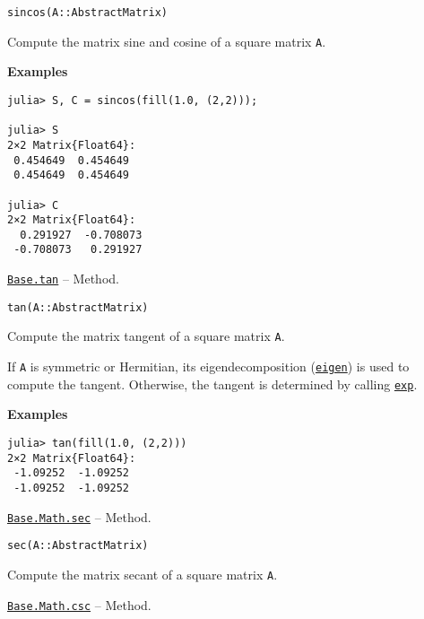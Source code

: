 \begin{adjustwidth}{2em}{0pt}


\begin{verbatim}
sincos(A::AbstractMatrix)
\end{verbatim}

Compute the matrix sine and cosine of a square matrix \texttt{A}.

\textbf{Examples}


\begin{verbatim}
julia> S, C = sincos(fill(1.0, (2,2)));

julia> S
2×2 Matrix{Float64}:
 0.454649  0.454649
 0.454649  0.454649

julia> C
2×2 Matrix{Float64}:
  0.291927  -0.708073
 -0.708073   0.291927
\end{verbatim}



\end{adjustwidth}
\hypertarget{9080944892790572256}{}
\hyperlink{9080944892790572256}{\texttt{Base.tan}}  -- {Method.}

\begin{adjustwidth}{2em}{0pt}


\begin{verbatim}
tan(A::AbstractMatrix)
\end{verbatim}

Compute the matrix tangent of a square matrix \texttt{A}.

If \texttt{A} is symmetric or Hermitian, its eigendecomposition (\hyperlink{11056016707394839114}{\texttt{eigen}}) is used to compute the tangent. Otherwise, the tangent is determined by calling \hyperlink{5801729597955756107}{\texttt{exp}}.

\textbf{Examples}


\begin{verbatim}
julia> tan(fill(1.0, (2,2)))
2×2 Matrix{Float64}:
 -1.09252  -1.09252
 -1.09252  -1.09252
\end{verbatim}



\end{adjustwidth}
\hypertarget{5271173141720820935}{}
\hyperlink{5271173141720820935}{\texttt{Base.Math.sec}}  -- {Method.}

\begin{adjustwidth}{2em}{0pt}


\begin{verbatim}
sec(A::AbstractMatrix)
\end{verbatim}

Compute the matrix secant of a square matrix \texttt{A}.



\end{adjustwidth}
\hypertarget{14560901933904109267}{}
\hyperlink{14560901933904109267}{\texttt{Base.Math.csc}}  -- {Method.}

